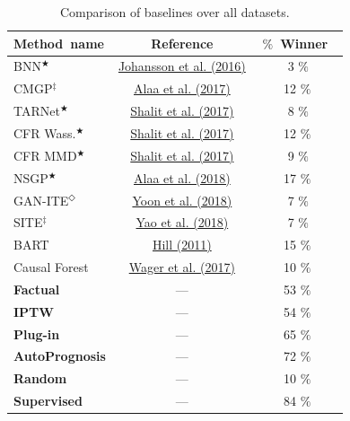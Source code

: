 \documentclass [PhD] {uclathes}
\begin{document}
\begin{table}[t]
\centering %
\begin{tabular}{|lcc|}
\hline
\mbox{\footnotesize \bf Method name} & \mbox{\footnotesize \bf Reference} & \,\,\mbox{\footnotesize \bf $\%$ Winner}\,\,\,\,  \\
\hline
\hline 
{\footnotesize BNN$^{\bigstar}$} & \href{http://proceedings.mlr.press/v48/johansson16.html}{Johansson et al. (2016)} & \,3 $\%$   \\ \hline
{\footnotesize CMGP$^{\ddagger}$} & \href{https://papers.nips.cc/paper/6934-bayesian-inference-of-individualized-treatment-effects-using-multi-task-gaussian-processes.pdf}{Alaa et al. (2017)} &  12 $\%$   \\ \hline
{\footnotesize TARNet$^{\bigstar}$} & \href{http://proceedings.mlr.press/v70/shalit17a.html}{Shalit et al. (2017)} &  \,8 $\%$   \\ \hline
{\footnotesize CFR Wass.$^{\bigstar}$} & \href{http://proceedings.mlr.press/v70/shalit17a.html}{Shalit et al. (2017)} &  12 $\%$  \\ \hline
{\footnotesize CFR MMD$^{\bigstar}$} & \href{http://proceedings.mlr.press/v70/shalit17a.html}{Shalit et al. (2017)} &  \,9 $\%$  \\ \hline
{\footnotesize NSGP$^{\bigstar}$} & \href{http://proceedings.mlr.press/v80/alaa18a.html}{Alaa et al. (2018)} &  17 $\%$   \\ \hline
{\footnotesize GAN-ITE$^{\Diamond}$} & \href{https://openreview.net/forum?id=ByKWUeWA-}{Yoon et al. (2018)} &   \,7 $\%$  \\ \hline
{\footnotesize SITE$^{\ddagger}$} & \href{https://papers.nips.cc/paper/7529-representation-learning-for-treatment-effect-estimation-from-observational-data.pdf}{Yao et al. (2018)} &  \,7 $\%$  \\ \midrule[.025in]
{\footnotesize BART} & \href{https://www.tandfonline.com/doi/abs/10.1198/jcgs.2010.08162}{Hill (2011)} & 15 $\%$  \\ \hline
{\footnotesize Causal Forest} & \href{https://arxiv.org/abs/1510.04342}{Wager et al. (2017)} & 10 $\%$  \\ \midrule[.025in]
{\footnotesize {\bf Factual}} & --- & 53 $\%$  \\ \hline
{\footnotesize {\bf IPTW}} & --- & 54 $\%$ \\ \hline
{\footnotesize {\bf Plug-in}} & --- & 65 $\%$  \\ \hline
{\footnotesize {\bf AutoPrognosis}} & --- & 72 $\%$ \\ \midrule[.025in]
{\footnotesize {\bf Random}} & --- & 10 $\%$  \\ \hline
{\footnotesize {\bf Supervised}} & --- & 84 $\%$ \\ \hline
\end{tabular}
\caption{Comparison of baselines over all datasets.}
\label{ch4Table2}
\end{table}
\end{document}
